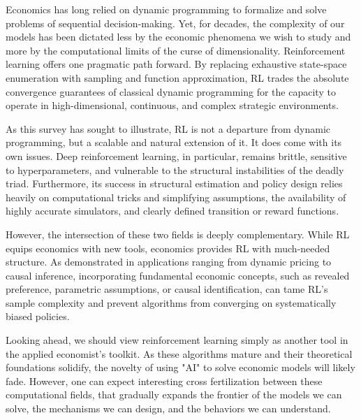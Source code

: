 Economics has long relied on dynamic programming to formalize and solve problems of sequential decision-making. Yet, for decades, the complexity of our models has been dictated less by the economic phenomena we wish to study and more by the computational limits of the curse of dimensionality. Reinforcement learning offers one pragmatic path forward. By replacing exhaustive state-space enumeration with sampling and function approximation, RL trades the absolute convergence guarantees of classical dynamic programming for the capacity to operate in high-dimensional, continuous, and complex strategic environments.

As this survey has sought to illustrate, RL is not a departure from dynamic programming, but a scalable and natural extension of it. It does come with its own issues. Deep reinforcement learning, in particular, remains brittle, sensitive to hyperparameters, and vulnerable to the structural instabilities of the deadly triad. Furthermore, its success in structural estimation and policy design relies heavily on computational tricks and simplifying assumptions, the availability of highly accurate simulators, and clearly defined transition or reward functions.

However, the intersection of these two fields is deeply complementary. While RL equips economics with new tools, economics provides RL with much-needed structure. As demonstrated in applications ranging from dynamic pricing to causal inference, incorporating fundamental economic concepts, such as revealed preference, parametric assumptions, or causal identification, can tame RL’s sample complexity and prevent algorithms from converging on systematically biased policies.

Looking ahead, we should view reinforcement learning simply as another tool in the applied economist’s toolkit. As these algorithms mature and their theoretical foundations solidify, the novelty of using "AI" to solve economic models will likely fade. However, one can expect interesting cross fertilization between these computational fields, that gradually expands the frontier of the models we can solve, the mechanisms we can design, and the behaviors we can understand.
